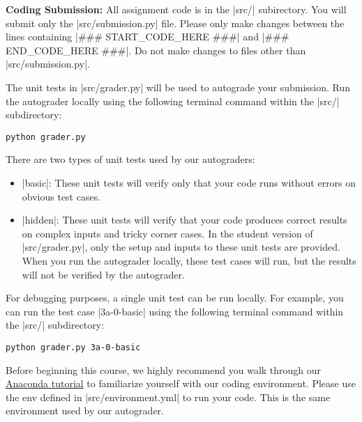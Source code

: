 {\bf Coding Submission:}
All assignment code is in the |src/| subirectory.  You will submit only the
|src/submission.py| file.  Please only make changes between the lines containing
|### START_CODE_HERE ###| and |### END_CODE_HERE ###|. Do not make changes to
files other than |src/submission.py|.

The unit tests in |src/grader.py| will be used to autograde your submission.
Run the autograder locally using the following terminal command within the
|src/| subdirectory:
\begin{lstlisting}
python grader.py
\end{lstlisting}

There are two types of unit tests used by our autograders:
\begin{itemize}
  \item |basic|:  These unit tests will verify only that your code runs without
  errors on obvious test cases.
  \item |hidden|: These unit tests will verify that your code produces correct
  results on complex inputs and tricky corner cases.  In the student version of
  |src/grader.py|, only the setup and inputs to these unit tests are provided.
  When you run the autograder locally, these test cases will run, but the
  results will not be verified by the autograder.
\end{itemize}

For debugging purposes, a single unit test can be run locally.  For example, you
can run the test case |3a-0-basic| using the following terminal command within
the |src/| subdirectory:
\begin{lstlisting}
python grader.py 3a-0-basic
\end{lstlisting}

Before beginning this course, we highly recommend you walk through our
\href{https://stanford.box.com/s/nvkolsrl6nhd00u8oeypj0ojloivhm5n}{Anaconda
tutorial} to familiarize yourself with
our coding environment.  Please use the env defined in |src/environment.yml|
to run your code.  This is the same environment used by our autograder.
